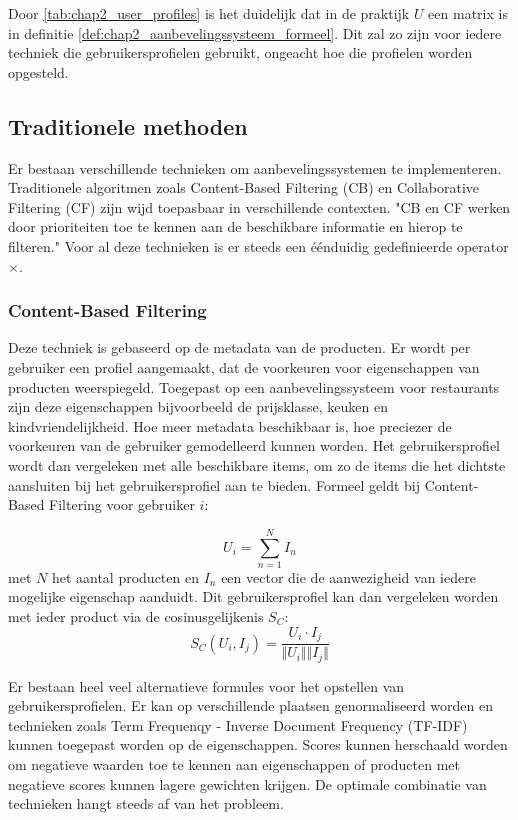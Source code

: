 Door \autoref{tab:chap2_user_profiles} is het duidelijk dat in de praktijk $U$ een matrix is in definitie \ref{def:chap2_aanbevelingssysteem_formeel}. Dit zal zo zijn voor iedere techniek die gebruikersprofielen gebruikt, ongeacht hoe die profielen worden opgesteld.

\subsection{Traditionele methoden}
Er bestaan verschillende technieken om aanbevelingssystemen te implementeren. Traditionele algoritmen zoals Content-Based Filtering (CB) en Collaborative Filtering (CF) zijn wijd toepasbaar in verschillende contexten. "CB en CF werken door prioriteiten toe te kennen aan de beschikbare informatie en hierop te filteren." \cite{overzicht_technieken} Voor al deze technieken is er steeds een éénduidig gedefinieerde operator $\times$.


\subsubsection{Content-Based Filtering}
Deze techniek is gebaseerd op de metadata van de producten. Er wordt per gebruiker een profiel aangemaakt, dat de voorkeuren voor eigenschappen van producten weerspiegeld. Toegepast op een aanbevelingssysteem voor restaurants zijn deze eigenschappen bijvoorbeeld de prijsklasse, keuken en kindvriendelijkheid. Hoe meer metadata beschikbaar is, hoe preciezer de voorkeuren van de gebruiker gemodelleerd kunnen worden. Het gebruikersprofiel wordt dan vergeleken met alle beschikbare items, om zo de items die het dichtste aansluiten bij het gebruikersprofiel aan te bieden. Formeel geldt bij Content-Based Filtering voor gebruiker $i$:


\begin{equation}
    U_i = \sum_{n=1}^{N} I_n
    \label{eq:chap2_cb_user_profile}
\end{equation}
met $N$ het aantal producten en $I_n$ een vector die de aanwezigheid van iedere mogelijke eigenschap aanduidt. Dit gebruikersprofiel kan dan vergeleken worden met ieder product via de cosinusgelijkenis $S_C$:
\begin{equation}
    S_C(U_i, I_j) = \frac{U_i \cdot I_j}{\Vert U_i \Vert \Vert I_j \Vert}
    \label{eq:chap2_cb_cosine_similarity}
\end{equation}

Er bestaan heel veel alternatieve formules voor het opstellen van gebruikersprofielen. Er kan op verschillende plaatsen genormaliseerd worden en technieken zoals Term Frequenqy - Inverse Document Frequency (TF-IDF) kunnen toegepast worden op de eigenschappen. Scores kunnen herschaald worden om negatieve waarden toe te kennen aan eigenschappen of producten met negatieve scores kunnen lagere gewichten krijgen. De optimale combinatie van technieken hangt steeds af van het probleem.

